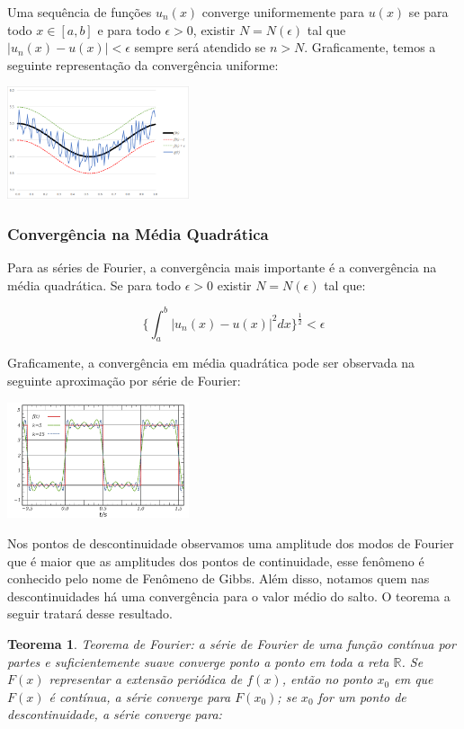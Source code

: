 \documentclass[a4paper,portuguese,9pt,final]{extarticle}
\newtheorem{theorem}{Teorema}[section]
\begin{document}
\begin{multicols*}{2}
                Uma sequência de funções $u_n (x)$ converge uniformemente para $u(x)$ se para todo $x \in [a,b]$ e para todo $\epsilon >0$, existir $N=N(\epsilon)$ tal que $|u_n (x) - u(x)| < \epsilon$ sempre será atendido se $n>N$. Graficamente, temos a seguinte representação da convergência uniforme:

                \includegraphics[width=0.4\textwidth]{uniform}


            \subsubsection{Convergência na Média Quadrática}

                Para as séries de Fourier, a convergência mais importante é a convergência na média quadrática. Se para todo
$\epsilon >0$ existir $N=N(\epsilon)$ tal que:

                $$\{\int_{a}^{b} |u_n (x) - u(x)|^2 dx\}^{\frac{1}{2}} < \epsilon$$

                Graficamente, a convergência em média quadrática pode ser observada na seguinte aproximação por série de Fourier:

                \includegraphics[width=0.4\textwidth]{conv_fourier}


                Nos pontos de descontinuidade observamos uma amplitude dos modos de Fourier que é maior que as amplitudes dos pontos de continuidade, esse fenômeno é conhecido pelo nome de Fenômeno de Gibbs. Além disso, notamos quem nas descontinuidades há uma convergência para o valor médio do salto. O teorema a seguir tratará desse resultado.
                

            \begin{theorem}	
                
                Teorema de Fourier: a série de Fourier de uma função contínua por partes e suficientemente suave converge ponto a ponto em toda a reta $ \mathbb{R} $. Se $ F(x) $ representar a extensão periódica de $ f(x) $, então no ponto $ x_{0} $ em que $ F(x) $ é contínua, a série converge para $ F(x_{0}) $; se $ x_{0} $ for um ponto de descontinuidade, a série converge para:


\end{theorem}
\end{multicols*}
\end{document}
